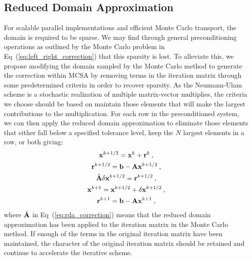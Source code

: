 \subsection{Reduced Domain Approximation}
\label{subsec:reduced_domain_approximation}
For scalable parallel implementations and efficient Monte Carlo
transport, the domain is required to be sparse. We may find through
general preconditioning operations as outlined by the Monte Carlo
problem in Eq~(\ref{eq:left_right_correction}) that this sparsity is
lost. To alleviate this, we propose modifying the domain sampled by
the Monte Carlo method to generate the correction within MCSA by
removing terms in the iteration matrix through some predetermined
criteria in order to recover sparsity. As the Neumann-Ulam scheme is a
stochastic realization of multiple matrix-vector multiplies, the
criteria we choose should be based on maintain those elements that
will make the largest contributions to the multiplication. For each
row in the preconditioned system, we can then apply the reduced domain
approximation to eliminate those elements that either fall below a
specified tolerance level, keep the $N$ largest elements in a row, or
both giving:
\begin{subequations}
  \begin{gather}
    \mathbf{x}^{k+1/2} = \mathbf{x}^k + \mathbf{r}^k\:,\\
    \mathbf{r}^{k+1/2} = \mathbf{b} - \mathbf{A}\mathbf{x}^{k+1/2}\:,\\
    \hat{\mathbf{A}}\delta\mathbf{x}^{k+1/2} = \mathbf{r}^{k+1/2}\:, 
    \label{eq:rda_correction}\\
    \mathbf{x}^{k+1} = \mathbf{x}^{k+1/2} + \delta \mathbf{x}^{k+1/2}\:,\\
    \mathbf{r}^{k+1} = \mathbf{b} - \mathbf{A}\mathbf{x}^{k+1}\:,
  \end{gather}
  \label{eq:rda_mcsa}
\end{subequations}
where $\hat{\mathbf{A}}$ in Eq~(\ref{eq:rda_correction}) means that the
reduced domain approximation has been applied to the iteration matrix
in the Monte Carlo method. If enough of the terms in the original
iteration matrix have been maintained, the character of the original
iteration matrix should be retained and continue to accelerate the
iterative scheme.

\clearpage
